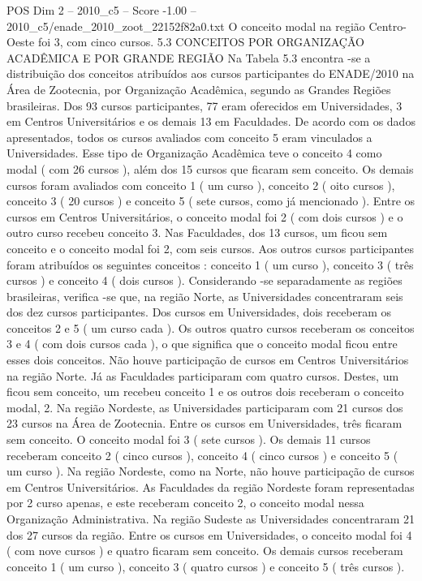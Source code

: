 \begin{textsample}{POS Dim 2 – 2010\_c5 – Score -1.00 – 2010\_c5/enade\_2010\_zoot\_22152f82a0.txt}
O conceito modal na região Centro-Oeste foi 3, com cinco cursos. 5.3 CONCEITOS POR ORGANIZAÇÃO ACADÊMICA E POR GRANDE REGIÃO Na Tabela 5.3 encontra -se a distribuição dos conceitos atribuídos aos cursos participantes do ENADE/2010 na Área de Zootecnia, por Organização Acadêmica, segundo as Grandes Regiões brasileiras.
Dos 93 cursos participantes, 77 eram oferecidos em Universidades, 3 em Centros Universitários e os demais 13 em Faculdades.
De acordo com os dados apresentados, todos os cursos avaliados com conceito 5 eram vinculados a Universidades.
Esse tipo de Organização Acadêmica teve o conceito 4 como modal ( com 26 cursos ), além dos 15 cursos que ficaram sem conceito.
Os demais cursos foram avaliados com conceito 1 ( um curso ), conceito 2 ( oito cursos ), conceito 3 ( 20 cursos ) e conceito 5 ( sete cursos, como já mencionado ).
Entre os cursos em Centros Universitários, o conceito modal foi 2 ( com dois cursos ) e o outro curso recebeu conceito 3.
Nas Faculdades, dos 13 cursos, um ficou sem conceito e o conceito modal foi 2, com seis cursos.
Aos outros cursos participantes foram atribuídos os seguintes conceitos : conceito 1 ( um curso ), conceito 3 ( três cursos ) e conceito 4 ( dois cursos ).
Considerando -se separadamente as regiões brasileiras, verifica -se que, na região Norte, as Universidades concentraram seis dos dez cursos participantes.
Dos cursos em Universidades, dois receberam os conceitos 2 e 5 ( um curso cada ).
Os outros quatro cursos receberam os conceitos 3 e 4 ( com dois cursos cada ), o que significa que o conceito modal ficou entre esses dois conceitos.
Não houve participação de cursos em Centros Universitários na região Norte.
Já as Faculdades participaram com quatro cursos.
Destes, um ficou sem conceito, um recebeu conceito 1 e os outros dois receberam o conceito modal, 2.
Na região Nordeste, as Universidades participaram com 21 cursos dos 23 cursos na Área de Zootecnia.
Entre os cursos em Universidades, três ficaram sem conceito.
O conceito modal foi 3 ( sete cursos ).
Os demais 11 cursos receberam conceito 2 ( cinco cursos ), conceito 4 ( cinco cursos ) e conceito 5 ( um curso ).
Na região Nordeste, como na Norte, não houve participação de cursos em Centros Universitários.
As Faculdades da região Nordeste foram representadas por 2 curso apenas, e este receberam conceito 2, o conceito modal nessa Organização Administrativa.
Na região Sudeste as Universidades concentraram 21 dos 27 cursos da região.
Entre os cursos em Universidades, o conceito modal foi 4 ( com nove cursos ) e quatro ficaram sem conceito.
Os demais cursos receberam conceito 1 ( um curso ), conceito 3 ( quatro cursos ) e conceito 5 ( três cursos ).

\end{textsample}
